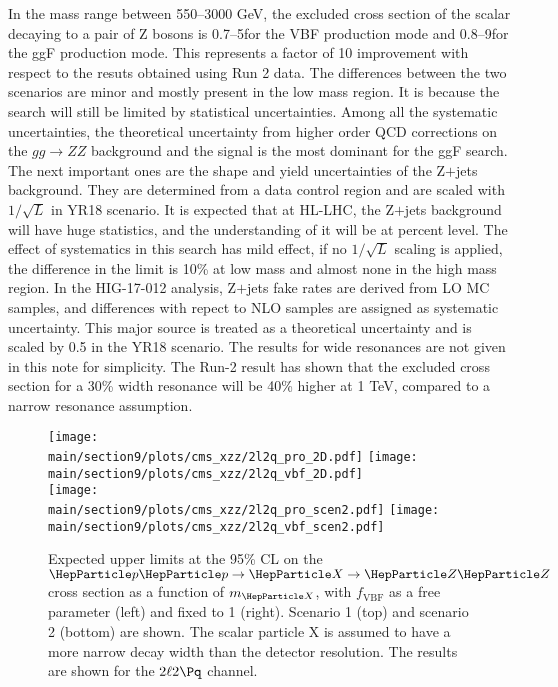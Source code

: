 In the mass range between 550--3000 GeV, the excluded cross section of the scalar decaying to a pair of Z bosons is 0.7--5\fb for the VBF production mode and 0.8--9\fb for the ggF production mode. This represents a factor of 10 improvement with respect to the resuts obtained using Run 2 data. The differences between the two scenarios are minor and mostly present in the low mass region. It is because the search will still be limited by statistical uncertainties. Among all the systematic uncertainties, the theoretical uncertainty from higher order QCD corrections on the $gg\to ZZ$ background and the signal is the most dominant for the ggF search. The next important ones are the shape and yield uncertainties of the Z$+$jets background. They are determined from a data control region and are scaled with $1/\sqrt{L}$ in YR18 scenario. It is expected that at HL-LHC, the Z$+$jets background will have huge statistics, and the understanding of it will be at percent level. The effect of systematics in this search has mild effect, if no $1/\sqrt{L}$ scaling is applied, the difference in the limit is 10\% at low mass and almost none in the high mass region. In the HIG-17-012 analysis, Z$+$jets fake rates are derived from LO MC samples, and differences with repect to NLO samples are assigned as systematic uncertainty. This major source is treated as a theoretical uncertainty and is scaled by 0.5 in the YR18 scenario. 
The results for wide resonances are not given in this note for simplicity. The Run-2 result has shown that the excluded cross section for a 30\% width resonance will be 40\% higher at 1 TeV, compared to a narrow resonance assumption. 

\begin{figure}[htbp]
  \centering
  \texttt{[image: \\main/section9/plots/cms\_xzz/2l2q\_pro\_2D.pdf]}
  \texttt{[image: \\main/section9/plots/cms\_xzz/2l2q\_vbf\_2D.pdf]}\\
  \texttt{[image: \\main/section9/plots/cms\_xzz/2l2q\_pro\_scen2.pdf]}
  \texttt{[image: \\main/section9/plots/cms\_xzz/2l2q\_vbf\_scen2.pdf]}
  \caption{Expected upper limits at the 95\% CL on the
    $\Pp\Pp\to\PX\to\PZ\PZ$ cross section as a function of $m_{\PX}$,
    with $f_{\mathrm{VBF}}$ as a free parameter (left) and fixed to 1
    (right). Scenario 1 (top) and scenario 2 (bottom) are shown. The
    scalar particle X is assumed to have a more narrow decay width
    than the detector resolution. The results are shown for the
    $2\ell2\Pq$ channel.\label{fig:combinedresult}}
\end{figure}

